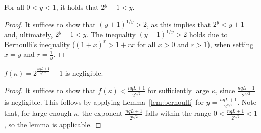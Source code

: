 \begin{lemma}\label{lem:bernoulli}
  For all $0 < y < 1$, it holds that $2^y - 1 < y$.
\end{lemma}
\begin{proof}
  It suffices to show that $(y + 1)^{1/y} > 2$,
  as this implies that $2^y < y + 1$ and, ultimately, $2^y - 1 < y$.
  The inequality $(y + 1)^{1/y} > 2$ holds due to Bernoulli's
  inequality ($(1 + x)^r > 1 + rx$ for all $x > 0$ and $r > 1$),
  when setting $x = y$ and $r = \frac{1}{y}$.
  \Qed
\end{proof}

\begin{lemma}
  $f(\kappa) = 2^{\frac{nqL + 1}{2^{\kappa/2}}} - 1$ is negligible.
\end{lemma}
\begin{proof}
  It suffices to show that $f(\kappa) < \frac{nqL + 1}{2^{\kappa/2}}$
  for sufficiently large $\kappa$, since $\frac{nqL + 1}{2^{\kappa/2}}$
  is negligible.
  This follows by applying Lemma~\ref{lem:bernoulli} for $y = \frac{nqL + 1}{2^{\kappa/2}}$.
  Note that, for large enough $\kappa$, the exponent $\frac{nqL + 1}{2^{\kappa/2}}$
  falls within the range $0 < \frac{nqL + 1}{2^{\kappa/2}} < 1$,
  so the lemma is applicable.
  \Qed
\end{proof}